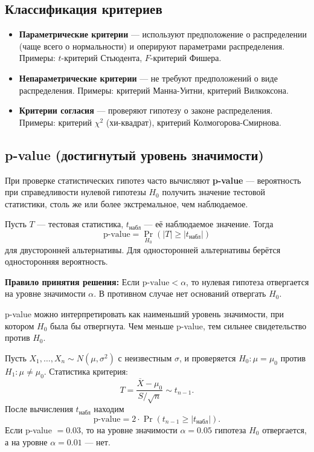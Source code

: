 \documentclass[10pt]{article}
\begin{document}
\subsection{Классификация критериев}
\begin{itemize}
    \item \textbf{Параметрические критерии} — используют предположение о распределении (чаще всего о нормальности) и оперируют параметрами распределения. Примеры: $t$-критерий Стьюдента, $F$-критерий Фишера.
    \item \textbf{Непараметрические критерии} — не требуют предположений о виде распределения. Примеры: критерий Манна-Уитни, критерий Вилкоксона.
    \item \textbf{Критерии согласия} — проверяют гипотезу о законе распределения. Примеры: критерий $\chi^2$ (хи-квадрат), критерий Колмогорова-Смирнова.
\end{itemize}

\subsection{p-value (достигнутый уровень значимости)}
При проверке статистических гипотез часто вычисляют \textbf{p-value} — вероятность при справедливости нулевой гипотезы $H_0$ получить значение тестовой статистики, столь же или более экстремальное, чем наблюдаемое.

\begin{definition}
Пусть $T$ — тестовая статистика, $t_{\text{набл}}$ — её наблюдаемое значение. Тогда
\[
\text{p-value} = \Pr_{H_0}(|T| \ge |t_{\text{набл}}|)
\]
для двусторонней альтернативы. Для односторонней альтернативы берётся односторонняя вероятность.
\end{definition}

\textbf{Правило принятия решения:}
Если $\text{p-value} < \alpha$, то нулевая гипотеза отвергается на уровне значимости $\alpha$. В противном случае нет оснований отвергать $H_0$.

p-value можно интерпретировать как наименьший уровень значимости, при котором $H_0$ была бы отвергнута. Чем меньше p-value, тем сильнее свидетельство против $H_0$.

\begin{example}
Пусть $X_1,\dots,X_n \sim N(\mu,\sigma^2)$ с неизвестным $\sigma$, и проверяется $H_0: \mu = \mu_0$ против $H_1: \mu \neq \mu_0$. Статистика критерия:
\[
T = \frac{\overline{X} - \mu_0}{S/\sqrt{n}} \sim t_{n-1}.
\]
После вычисления $t_{\text{набл}}$ находим
\[
\text{p-value} = 2 \cdot \Pr(t_{n-1} \ge |t_{\text{набл}}|).
\]
Если p-value $= 0.03$, то на уровне значимости $\alpha = 0.05$ гипотеза $H_0$ отвергается, а на уровне $\alpha = 0.01$ — нет.
\end{example}
\end{document}
